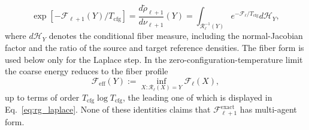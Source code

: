 \documentclass[11pt]{article}
\begin{document}
\begin{equation}
\exp[-\mathcal{F}_{\ell+1}(Y)/T_{\mathrm{cfg}}] = \frac{d\widetilde{\rho}_{\ell+1}}{d\nu_{\ell+1}}(Y) = \int_{\mathcal{R}_\ell^{-1}(Y)} e^{-\mathcal{F}_\ell/T_{\mathrm{cfg}}}d\mathcal{H}_Y,
\label{eq:rg_exact_free_energy}
\end{equation}
where $d\mathcal{H}_Y$ denotes the conditional fiber measure, including the normal-Jacobian factor and the ratio of the source and target reference densities. The fiber form is used below only for the Laplace step. In the zero-configuration-temperature limit the coarse energy reduces to the fiber profile
\begin{equation}
\mathcal{F}_{\mathrm{eff}}(Y) := \inf_{X : \mathcal{R}_\ell(X) = Y} \mathcal{F}_\ell(X),
\label{eq:rg_zero_temperature_profile}
\end{equation}
up to terms of order $T_{\mathrm{cfg}}\log T_{\mathrm{cfg}}$, the leading one of which is displayed in Eq.~\eqref{eq:rg_laplace}. None of these identities claims that $\mathcal{F}^{\mathrm{exact}}_{\ell+1}$ has multi-agent form.
\end{document}
